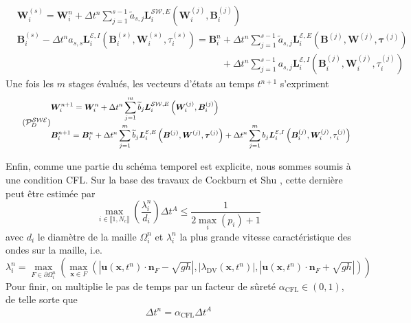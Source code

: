 \documentclass[11pt, a4paper, oneside]{report}
\begin{document}
\begin{equation}
    \begin{aligned}
        & \bm{W}_i^{(s)} = \bm{W}_i^n + \Delta t^n \sum_{j = 1}^{s-1} \widetilde{a}_{s, j} \bm{L}_i^{\mathcal{SW}, E} \left( \bm{W}_i^{(j)}, \bm{B}_i^{(j)} \right) \\
        & \bm{B}_i^{(s)} - \Delta t^n a_{s, s} \bm{L}_i^{\mathcal{E}, I} \left( \bm{B}_i^{(s)}, \bm{W}_i^{(s)}, \tau_i^{(s)} \right) = \bm{B}_i^n + \Delta t^n \sum_{j = 1}^{s-1} \widetilde{a}_{s, j} \bm{L}_i^{\mathcal{E}, E} \left( \bm{B}^{(j)}, \bm{W}^{(j)}, \bm{\tau}^{(j)} \right) \\
        & \phantom{\bm{B}_i^{(s)} - \Delta t^n a_{s, s} \bm{L}_i^{\mathcal{E}, I} \left( \bm{B}_i^{(s)}, \bm{W}_i^{(s)}, \tau_i^{(s)} \right) = \bm{B}_i^n } + \Delta t^n \sum_{j = 1}^{s-1} a_{s, j} \bm{L}_i^{\mathcal{E}, I} \left( \bm{B}_i^{(j)}, \bm{W}_i^{(j)}, \tau_i^{(j)} \right)
    \end{aligned}
\end{equation}
Une fois les $m$ stages évalués, les vecteurs d'états au temps $t^{n+1}$ s'expriment
\begin{equation} \tag{$\mathcal{P}_D^\mathcal{SWE}$} \label{eq:Probleme_discret_Saint_Venant_Exner}
    \begin{aligned}
        & \bm{W}_i^{n+1} = \bm{W}_i^n + \Delta t^n \sum_{j = 1}^{m} \widetilde{b}_j \bm{L}_i^{\mathcal{SW}, E} \left( \bm{W}_i^{(j)}, \bm{B}_i^{(j)} \right) \\
        & \bm{B}_i^{n+1} = \bm{B}_i^n + \Delta t^n \sum_{j = 1}^{m} \widetilde{b}_j \bm{L}_i^{\mathcal{E}, E} \left( \bm{B}^{(j)}, \bm{W}^{(j)}, \bm{\tau}^{(j)} \right) + \Delta t^n \sum_{j = 1}^{m} b_j \bm{L}_i^{\mathcal{E}, I} \left( \bm{B}_i^{(j)}, \bm{W}_i^{(j)}, \tau_i^{(j)} \right)
    \end{aligned}
\end{equation}

Enfin, comme une partie du schéma temporel est explicite, nous sommes soumis à une condition CFL. Sur la base des travaux de Cockburn et Shu \cite{cockburn2001runge}, cette dernière peut être estimée par
\begin{equation}
    \max_{i \in \llbracket 1, N_e \rrbracket} \left( \frac{\lambda_i^n}{d_i} \right) \Delta t^A \leq \frac{1}{2 \max_i(p_i) + 1}
\end{equation}
avec $d_i$ le diamètre de la maille $\Omega_i^n$ et $\lambda_i^n$ la plus grande vitesse caractéristique des ondes sur la maille, i.e.
\begin{equation}
    \lambda_i^n = \max_{F \in \partial \Omega_i^n} \left( \max_{\bm{x} \in F} \left( \left| \bm{u}(\bm{x}, t^n) \cdot \bm{n}_F - \sqrt{gh} \right|, \left| \lambda_\text{DV} (\bm{x}, t^n) \right|, \left| \bm{u}(\bm{x}, t^n) \cdot \bm{n}_F + \sqrt{gh} \right| \right) \right)
\end{equation}
Pour finir, on multiplie le pas de temps par un facteur de sûreté $\alpha_\text{CFL} \in (0,1)$, de telle sorte que
\begin{equation}
    \Delta t^n = \alpha_\text{CFL} \Delta t^A
\end{equation}
\end{document}

